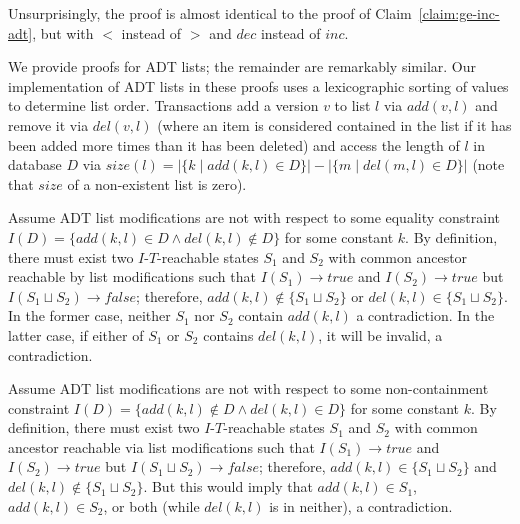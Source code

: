 \begin{claim} \label{claim:le-inc-adt} Unsurprisingly, the proof is almost identical to the proof of Claim~\ref{claim:ge-inc-adt}, but with $<$ instead of $>$ and $dec$ instead of $inc$. \end{claim}

We provide proofs for ADT lists; the remainder are remarkably similar. Our implementation of ADT lists in these proofs uses a lexicographic sorting of values to determine list order. Transactions add a version $v$ to list $l$ via $add(v,l)$ and remove it via $del(v,l)$ (where an item is considered contained in the list if it has been added more times than it has been deleted) and access the length of $l$ in database $D$ via $size(l) = |\{k \mid add(k, l) \in D\}|- |\{m \mid del(m, l) \in D\}|$ (note that $size$ of a non-existent list is zero).

\begin{claim}
  Assume ADT list modifications are not \iconfluent with respect to some equality constraint $I(D)=\{add(k, l) \in D \wedge del(k, l) \notin D \}$ for some constant $k$. By definition, there must exist two $I$-$T$-reachable states $S_1$ and $S_2$ with common ancestor reachable by list modifications such that $I(S_1) \rightarrow true$ and $I(S_2) \rightarrow true$ but $I(S_1 \sqcup S_2) \rightarrow false$; therefore, $add(k, l) \notin \{S_1 \sqcup S_2\}$ or $del(k, l) \in \{S_1 \sqcup S_2\}$. In the former case, neither $S_1$ nor $S_2$ contain $add(k,l)$ a contradiction. In the latter case, if either of $S_1$ or $S_2$ contains $del(k,l)$, it will be invalid, a contradiction.\end{claim}

\begin{claim}
Assume ADT list modifications are not \iconfluent with respect to some non-containment constraint $I(D)=\{add(k, l) \notin D \wedge del(k, l) \in D\}$ for some constant $k$. By definition, there must exist two $I$-$T$-reachable states $S_1$ and $S_2$ with common ancestor reachable via list modifications such that $I(S_1) \rightarrow true$ and $I(S_2) \rightarrow true$ but $I(S_1 \sqcup S_2) \rightarrow false$; therefore, $add(k, l) \in \{S_1 \sqcup S_2\}$ and $del(k,l) \notin \{S_1 \sqcup S_2\}$. But this would imply that $add(k, l) \in S_1$, $add(k, l) \in S_2$, or both (while $del(k,l)$ is in neither), a contradiction.\end{claim}

